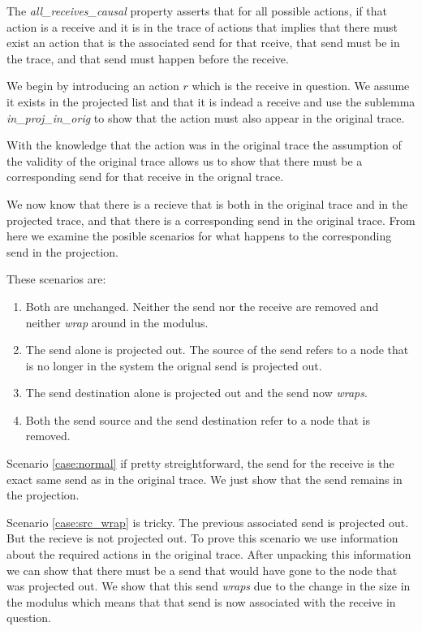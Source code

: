 \documentclass[runningheads]{llncs}
\begin{document}
The \emph{all\_receives\_causal} property asserts that for all possible actions, if that action is a receive and it is in the trace of actions that implies that there must exist an action that is the associated send for that rceive, that send must be in the trace, and that send must happen before the receive. 

We begin by introducing an action $r$ which is the receive in question. We assume it exists in the projected list and that it is indead a receive and use the sublemma \emph{in\_proj\_in\_orig} to show that the action must also appear in the original trace. 

With the knowledge that the action was in the original trace the assumption of the validity of the original trace allows us to show that there must be a corresponding send for that receive in the orignal trace. 

We now know that there is a recieve that is both in the original trace and in the projected trace, and that there is a corresponding send in the original trace. From here we examine the posible scenarios for what happens to the corresponding send in the projection.

These scenarios are:
\begin{enumerate}
\item \label{case:normal} Both are unchanged. Neither the send nor the receive are removed and neither \emph{wrap} around in the modulus.
\item \label{case:src_wrap} The send alone is projected out. The source of the send refers to a node that is no longer in the system the orignal send is projected out.
\item \label{case:dest_wrap} The send destination alone is projected out and the send now \emph{wraps}.
\item \label{case:both_wrap} Both the send source and the send destination refer to a node that is removed. 
\end{enumerate}


Scenario \ref{case:normal} if pretty streightforward, the send for the receive is the exact same send as in the original trace. We just show that the send remains in the projection.

Scenario \ref{case:src_wrap} is tricky. The previous associated send is projected out. But the recieve is not projected out. To prove this scenario we use information about the required actions in the original trace. After unpacking this information we can show that there must be a send that would have gone to the node that was projected out. We show that this send \emph{wraps} due to the change in the size in the modulus which means that that send is now associated with the receive in question.
\end{document}
